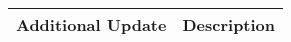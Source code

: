 \begin{table}[!h]
    \centering
    \begin{tabularx}{\textwidth}{|l|X|}
        \hline
        Additional Update & Description \\
        \hline
        \hline
    \end{tabularx}
\end{table}
